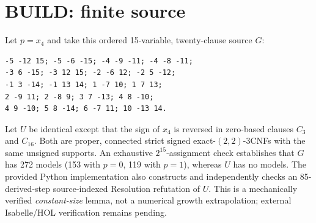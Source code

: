 \documentclass[11pt]{article}
\begin{document}
\section{BUILD: finite source}
Let $p=x_4$ and take this ordered 15-variable, twenty-clause source $G$:
\begin{verbatim}
-5 -12 15; -5 -6 -15; -4 -9 -11; -4 -8 -11;
-3 6 -15; -3 12 15; -2 -6 12; -2 5 -12;
-1 3 -14; -1 13 14; 1 -7 10; 1 7 13;
2 -9 11; 2 -8 9; 3 7 -13; 4 8 -10;
4 9 -10; 5 8 -14; 6 -7 11; 10 -13 14.
\end{verbatim}
Let $U$ be identical except that the sign of $x_4$ is reversed in zero-based clauses $C_3$ and $C_{16}$. Both are proper, connected strict signed exact-$(2,2)$-3CNFs with the same unsigned supports. An exhaustive $2^{15}$-assignment check establishes that $G$ has 272 models (153 with $p=0$, 119 with $p=1$), whereas $U$ has no models. The provided Python implementation also constructs and independently checks an 85-derived-step source-indexed Resolution refutation of $U$. This is a mechanically verified \emph{constant-size} lemma, not a numerical growth extrapolation; external Isabelle/HOL verification remains pending.
\end{document}
